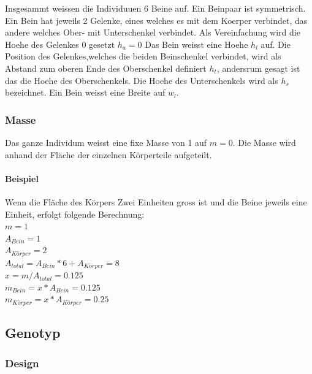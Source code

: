       Insgesammt weissen die Individuuen 6 Beine auf. Ein Beinpaar ist symmetrisch. Ein Bein hat jeweils 2 Gelenke,
      eines welches es mit dem Koerper verbindet,
      das andere welches Ober- mit Unterschenkel verbindet.
      Als Vereinfachung wird die Hoehe des Gelenkes 0 gesetzt  \(h_{a} = 0\)
      Das Bein weisst eine Hoehe \(h_{l}\) auf. Die Position des Gelenkes,welches die beiden Beinschenkel verbindet,
      wird als Abstand zum oberen Ende des Oberschenkel definiert \(h_{t}\),
      andersrum gesagt ist das die Hoehe des Oberschenkels.
      Die Hoehe des Unterschenkels wird als \(h_{s}\) bezeichnet.
      Ein Bein weisst eine Breite auf \(w_{l}\).
      \\
      

      \subsubsection{Masse\label{subs:Masse}}

        Das ganze Individum weisst eine fixe Masse von 1 auf \(m = 0\).
        Die Masse wird anhand der Fläche der einzelnen Körperteile aufgeteilt.
      \paragraph{Beispiel\label{par:MasseExample}}
        Wenn die Fläche des Körpers Zwei Einheiten gross ist und die Beine jeweils eine Einheit,
        erfolgt folgende Berechnung: \\
        \(m = 1\) \\
        \(A_{Bein} = 1\) \\
        \(A_{Körper} = 2\) \\
        \(A_{total} = A_{Bein} * 6 + A_{Körper} = 8 \) \\
        \( x = m / A_{total} = 0.125 \) \\
        \(m_{Bein} = x * A_{Bein} = 0.125\) \\
        \(m_{Körper} = x * A_{Körper} = 0.25\) \\

    \subsection{Genotyp\label{sub:Genotype}}

      \subsubsection{Design\label{subsub:GenotypeDesign}}


